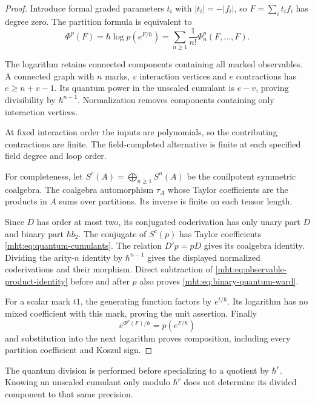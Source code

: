 \begin{proof}
Introduce formal graded parameters $t_i$ with $|t_i|=-|f_i|$, so
$F=\sum_i t_i f_i$ has degree zero. The partition formula is
equivalent to
\begin{equation}\label{mht:eq:connected-observable-generator}
 \Phi^p(F)=\hbar\log p(e^{F/\hbar})
       =\sum_{n\ge1}\frac1{n!}\Phi_n^p(F,\ldots,F).
\end{equation}

The logarithm retains connected components containing all marked
observables. A connected graph with $n$ marks, $v$ interaction
vertices and $e$ contractions has $e\ge n+v-1$. Its quantum power
in the unscaled cumulant is $e-v$, proving divisibility by
$\hbar^{n-1}$. Normalization removes components containing only
interaction vertices.

At fixed interaction order the inputs are
polynomials, so the contributing contractions are finite. The
field-completed alternative is finite at each specified field degree
and loop order.

For completeness, let $S^c(A)=\bigoplus_{n\ge1}S^n(A)$ be the
conilpotent symmetric coalgebra. The coalgebra automorphism $\tau_A$
whose Taylor coefficients are the products in $A$ sums over
partitions. Its inverse is finite on each tensor length.

Since $D$ has order at most two, its conjugated coderivation has only
unary part $D$ and binary part $\hbar b_2$.
The conjugate of $S^c(p)$ has Taylor coefficients
\eqref{mht:eq:quantum-cumulants}. The relation $D'p=pD$ gives its
coalgebra identity. Dividing the arity-$n$ identity by
$\hbar^{n-1}$ gives the displayed normalized coderivations and
their morphism. Direct subtraction of
\eqref{mht:eq:observable-product-identity} before and after $p$
also proves \eqref{mht:eq:binary-quantum-ward}.

For a scalar mark $t1$, the generating function factors by
$e^{t/\hbar}$. Its logarithm has no mixed coefficient with this
mark, proving the unit assertion. Finally
\[
 e^{\Phi^p(F)/\hbar}=p(e^{F/\hbar})
\]
and substitution into the next logarithm proves composition,
including every partition coefficient and Koszul sign.
\end{proof}

The quantum division is performed before specializing to a quotient
by $\hbar^r$. Knowing an unscaled cumulant only modulo $\hbar^r$
does not determine its divided component to that same precision.

